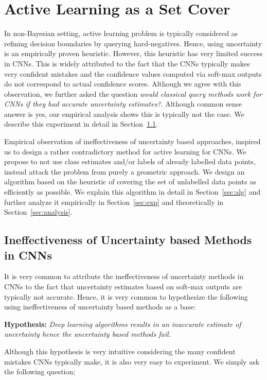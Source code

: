\documentclass{article}
\begin{document}
\section{Active Learning as a Set Cover}
In non-Bayesian setting, active learning problem is typically considered as refining decision boundaries by querying hard-negatives. Hence, using uncertainty is an empirically proven heuristic. However, this heuristic has very limited success in CNNs. This is widely attributed to the fact that the CNNs typically makes very confident mistakes and the confidence values computed via soft-max outputs do not correspond to actual confidence scores. Although we agree with this observation, we further asked the question \emph{would classical query methods work for CNNs if they had accurate uncertainty estimates?}. Although common sense answer is yes, our empirical analysis shows this is typically not the case. We describe this experiment in detail in Section~\ref{sec:whatif}.

Empirical observation of ineffectiveness of uncertainty based approaches, inspired us to design a rather contradictory method for active learning for CNNs. We propose to not use class estimates and/or labels of already labelled data points, instead attack the problem from purely a geometric approach. We design an algorithm based on the heuristic of covering the set of unlabelled data points as efficiently as possible. We explain this algorithm in detail in Section~\ref{sec:alg} and further analyze it empirically in Section~\ref{sec:exp} and theoretically in Section~\ref{sec:analysis}.

\subsection{Ineffectiveness of Uncertainty based Methods in CNNs}
\label{sec:whatif}
It is very common to attribute the ineffectiveness of uncertainty methods in CNNs to the fact that uncertainty estimates based on soft-max outputs are typically not accurate. Hence, it is very common to hypothesize the following using ineffectiveness of uncertainty based methods as a base:

\noindent\textbf{Hypothesis:} \emph{Deep learning algorithms results in an inaccurate estimate of uncertainty hence the uncertainty based methods fail.}

Although this hypothesis is very intuitive considering the many confident mistakes CNNs typically make, it is also very easy to experiment. We simply ask the following question;
\end{document}
